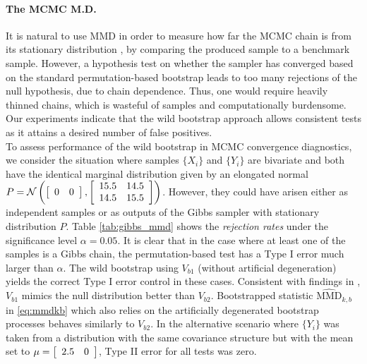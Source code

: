 \paragraph{The MCMC M.D.}
It is natural to use MMD in order to measure how far the MCMC chain is from its stationary distribution \cite[Section 5]{sejdinovic_KAMH}, 
by comparing the produced sample to a benchmark sample. However, a hypothesis test on whether the sampler has converged based on the standard permutation-based bootstrap leads to too many rejections of the null hypothesis, due to chain dependence. Thus, one would require heavily thinned chains, which is wasteful of samples and computationally burdensome.
Our experiments indicate that the wild bootstrap approach allows consistent tests as it attains a desired number of false positives.\\
To assess performance of the wild bootstrap in MCMC convergence diagnostics, we consider the situation where samples $\{X_i\}$ and $\{Y_i\}$ are bivariate and both have the identical marginal distribution given by an elongated normal
$P=\mathcal{N}\left(\left[\protect\begin{array}{cc}
0 & 0\protect\end{array}\right],\left[\protect\begin{array}{cc}
15.5 & 14.5\protect\\
14.5 & 15.5
\protect\end{array}\right]\right)$.
However, they could have arisen either as independent samples or as outputs of the Gibbs sampler with stationary distribution $P$. 
Table \ref{tab:gibbs_mmd} shows the \emph{rejection rates} under the significance level $\alpha=0.05$. It is clear that in the case where at least one of the samples is a Gibbs chain, the permutation-based test has a Type I error much larger than $\alpha$. 
The wild bootstrap using $V_{b1}$ (without artificial degeneration) yields the correct Type I error control in these cases. Consistent with findings in \cite[Section 5]{leucht_dependent_2013}, $V_{b1}$ mimics the null distribution better than $V_{b2}$. Bootstrapped statistic $\widehat{\text{MMD}}_{k,b}$ in \eqref{eq:mmdkb} which also relies on the artificially degenerated bootstrap processes behaves similarly to $V_{b2}$.
In the alternative scenario where $\{Y_i\}$ was taken from a distribution with the same covariance structure but with the mean set to $\mu= \left[\protect\begin{array}{cc}
2.5 & 0\protect\end{array}\right]$, Type II error for all tests was zero.
\vspace{-0.2cm}
